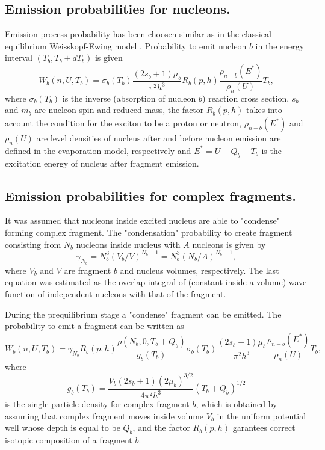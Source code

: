 \subsection{Emission probabilities for nucleons.} 

\hspace{1.0em}Emission process probability has been choosen similar as 
in the classical equilibrium Weisskopf-Ewing model \cite{WE40}.
Probability to emit nucleon $b$ in the energy interval $(T_b, T_b+dT_b)$
is given
\begin{equation}
\label{PCS16}W_{b}(n,U,T_b) = \sigma_{b}(T_b)\frac{(2s_b+1)\mu_b}{\pi^2 h^3}
R_b(p,h)
\frac{\rho_{n-b}(E^{*})}{\rho_n(U)}T_b,
\end{equation}
where $\sigma_{b}(T_b)$ is the inverse (absorption of nucleon $b$)
reaction cross section, $s_b$ and $m_b$ are nucleon spin and reduced
mass, the factor $R_b(p,h)$ takes into account the condition for the
exciton to be a proton or neutron, $\rho_{n-b}(E^{*})$ and $\rho_n(U)$
are level densities of nucleus after and before nucleon emission are
defined in the evaporation model, respectively and $E^{*}=U-Q_b-T_b$ is the
excitation energy of nucleus after fragment emission.
 
\subsection{Emission probabilities for complex fragments.}

\hspace{1.0em}It was assumed \cite{GMT83} that nucleons inside excited
nucleus are able to "condense" forming complex fragment.  The
"condensation" probability to create fragment consisting from $N_b$
nucleons inside nucleus with $A$ nucleons is given by
\begin{equation}
\label{PCS17} \gamma_{N_b}=N^3_b(V_b/V)^{N_b -1}=N^3_b(N_b/A)^{N_b -1},
\end{equation}
where $V_b$ and $V$ are fragment $b$ and nucleus volumes, respectively.
The last equation was estimated \cite{GMT83} as the overlap integral of
(constant inside a volume) wave function of independent nucleons with
that of the fragment.

During the prequilibrium stage a "condense" fragment can be emitted.
The probability to emit a fragment can be written as \cite{GMT83}
\begin{equation}
\label{PCS18}W_{b}(n,U,T_b) =\gamma_{N_b}R_b(p,h)
 \frac{\rho(N_b, 0, T_b + Q_b)}{g_b(T_b)}
 \sigma_{b}(T_b)\frac{(2s_b+1)\mu_b}{\pi^2 h^3}
\frac{\rho_{n-b}(E^{*})}{\rho_n(U)}T_b,
\end{equation}
where 
\begin{equation}
\label{PCS19}g_b(T_b)=\frac{V_b(2s_b+1)(2\mu_b)^{3/2}}{4\pi^2 h^3}(T_b+Q_b)^{1/2}  
\end{equation}
is the single-particle density for complex fragment $b$, which is
obtained by assuming that complex fragment moves inside volume $V_b$ in
the uniform potential well whose depth is equal to be $Q_b$, and the
factor $R_b(p,h)$ garantees correct isotopic composition of a fragment
$b$.

